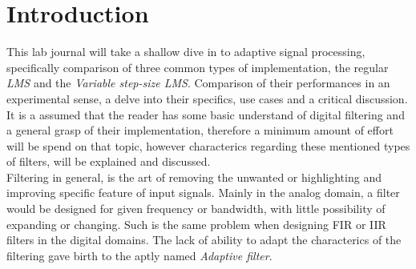 \section{Introduction}
This lab journal will take a shallow dive in to adaptive signal processing, specifically comparison 
of three common types of implementation, the regular \textit{LMS}\cite{wiki_lms} and the \textit{Variable step-size LMS}.
Comparison of their performances in an experimental sense, a delve into their specifics, use cases and a critical discussion.
\\
It is a assumed that the reader has some basic understand of digital filtering and a general grasp of their implementation, 
therefore a minimum amount of effort will be spend on that topic, however characterics regarding these
mentioned types of filters, will be explained and discussed.
\\
Filtering in general, is the art of removing the unwanted or highlighting and improving specific 
feature of input signals. Mainly in the analog domain, a filter would be designed for given
frequency or bandwidth, with little possibility of expanding or changing. Such is the 
same problem when designing FIR\cite{wiki_fir} or IIR\cite{wiki_iir} filters in the digital domains. 
The lack of ability to adapt the characterics of the filtering gave birth to the aptly named \textit{Adaptive filter}.